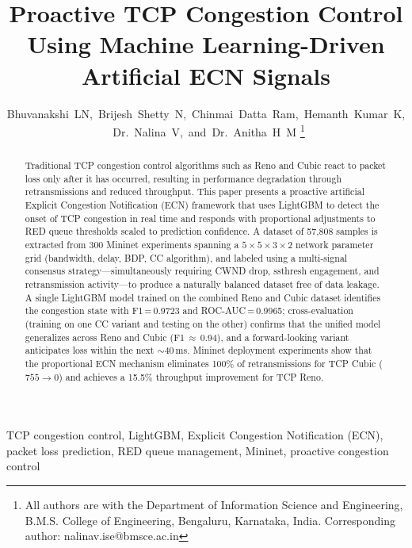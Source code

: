 \documentclass[journal]{IEEEtran}
\begin{document}
\title{Proactive TCP Congestion Control Using Machine Learning-Driven Artificial ECN Signals}

\author{Bhuvanakshi~LN,~Brijesh~Shetty~N,~Chinmai~Datta~Ram,~Hemanth~Kumar~K,~Dr.~Nalina~V,~and~Dr.~Anitha~H~M%
\thanks{All authors are with the Department of Information Science and Engineering,
B.M.S. College of Engineering, Bengaluru, Karnataka, India.
Corresponding author: nalinav.ise@bmsce.ac.in}}

\maketitle

\begin{abstract}
Traditional TCP congestion control algorithms such as Reno and Cubic react to packet loss only after it has occurred, resulting in performance degradation through retransmissions and reduced throughput. This paper presents a proactive artificial Explicit Congestion Notification (ECN) framework that uses LightGBM to detect the onset of TCP congestion in real time and responds with proportional adjustments to RED queue thresholds scaled to prediction confidence. A dataset of 57,808 samples is extracted from 300 Mininet experiments spanning a $5\times5\times3\times2$ network parameter grid (bandwidth, delay, BDP, CC algorithm), and labeled using a multi-signal consensus strategy---simultaneously requiring CWND drop, ssthresh engagement, and retransmission activity---to produce a naturally balanced dataset free of data leakage. A single LightGBM model trained on the combined Reno and Cubic dataset identifies the congestion state with F1\,=\,0.9723 and ROC-AUC\,=\,0.9965; cross-evaluation (training on one CC variant and testing on the other) confirms that the unified model generalizes across Reno and Cubic (F1\,$\approx$\,0.94), and a forward-looking variant anticipates loss within the next $\sim$40\,ms. Mininet deployment experiments show that the proportional ECN mechanism eliminates 100\% of retransmissions for TCP Cubic ($755\!\rightarrow\!0$) and achieves a 15.5\% throughput improvement for TCP Reno.
\end{abstract}

\begin{IEEEkeywords}
TCP congestion control, LightGBM, Explicit Congestion Notification (ECN), packet loss prediction, RED queue management, Mininet, proactive congestion control
\end{IEEEkeywords}

\end{document}
